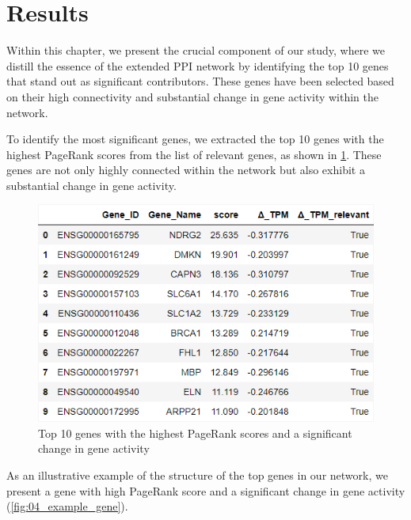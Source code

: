 \section{Results} \label{sec:results}

Within this chapter, we present the crucial component of our study,
where we distill the essence of the extended PPI network by identifying the top 10 genes that stand out as significant contributors.
These genes have been selected based on their high connectivity and substantial change in gene activity within the network.


To identify the most significant genes, we extracted the top 10 genes with the highest PageRank scores from the list of relevant genes,
as shown in \cref{fig:03_03_df_pagerank_relevant}.
These genes are not only highly connected within the network but also exhibit a substantial change in gene activity.

\begin{figure}[h]
    \centering
    \includegraphics[height=\dfheightdouble]{figures/03_03_df_pagerank_relevant}
    \caption{Top 10 genes with the highest PageRank scores and a significant change in gene activity}
    \label{fig:03_03_df_pagerank_relevant}
\end{figure}

As an illustrative example of the structure of the top genes in our network,
we present a gene with high PageRank score and a significant change in gene activity
(\cref{fig:04_example_gene}).

